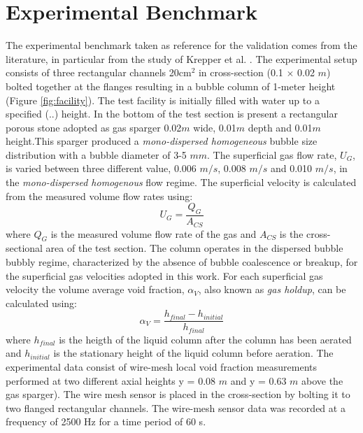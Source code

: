 \documentclass[11pt,a4paper]{article}
\begin{document}
\section{Experimental Benchmark}
\label{sec:expbench}
The  experimental benchmark taken as reference for the validation comes from the literature, in particular from the study of Krepper et al. \cite{krepper}. The experimental setup consists of three rectangular channels 20cm$^2$ in cross-section (0.1 $\times$ 0.02 $m$) bolted together at the flanges resulting in a bubble column of 1-meter height (Figure \ref{fig:facility}). The test facility is initially filled with water up to a specified (..) height. In the bottom of the test section is present a rectangular porous stone adopted as gas sparger 0.02$m$ wide, 0.01$m$ depth and 0.01$m$ height.This sparger produced a \textit{mono-dispersed homogeneous} bubble size distribution with a bubble diameter of 3-5 $mm$. The superficial gas flow rate, $U_G$, is varied between three different value, 0.006 $m/s$, 0.008 $m/s$ and 0.010 $m/s$, in the \textit{mono-dispersed homogenous} flow regime. The superficial velocity is calculated from the measured volume flow rates using: 
\begin{equation}
    U_G=\frac{Q_G}{A_{CS}}
\end{equation}
where $Q_G$ is the measured volume flow rate of the gas and $A_{CS}$ is the cross-sectional area of the test section. The column operates in the dispersed bubble bubbly regime, characterized by the absence of bubble coalescence or breakup, for the superficial gas velocities adopted in this work. For each superficial gas velocity the volume average void fraction, $\alpha_V$, also known as \textit{gas holdup}, can be calculated using: 
\begin{equation}
    \alpha_V=\frac{h_{final}-h_{initial}}{h_{final}}
\end{equation}
where $h_{final}$ is the heigth of the liquid column after the column has been aerated and $h_{initial}$ is the stationary height of the liquid column before aeration. The experimental data consist of wire-mesh local void fraction measurements performed at two different axial heights y = 0.08 $m$ and y = 0.63 $m$ above the gas sparger). The wire mesh sensor is placed in the cross-section by bolting it to two flanged rectangular channels. The wire-mesh sensor data was recorded at a frequency of 2500 Hz for a time period of 60 s. 
\end{document}
